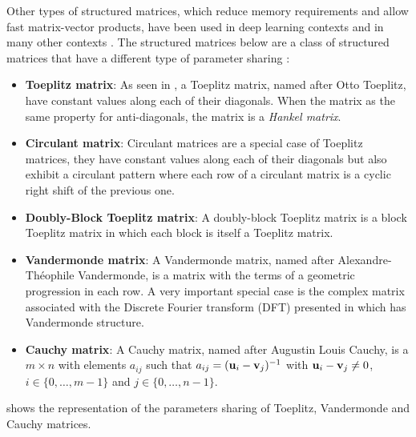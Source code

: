 {%
Other types of structured matrices, which reduce memory requirements and allow fast matrix-vector products, have been used in deep learning contexts and in many other contexts \cite{pan2001structured}.
The structured matrices below are a class of structured matrices that have a different type of parameter sharing :
\begin{itemize}
  \item \textbf{Toeplitz matrix}: As seen in , a Toeplitz matrix, named after Otto Toeplitz, have constant values along each of their diagonals. When the matrix as the same property for anti-diagonals, the matrix is a \emph{Hankel matrix}.
  \item \textbf{Circulant matrix}: Circulant matrices are a special case of Toeplitz matrices, they have constant values along each of their diagonals but also exhibit a circulant pattern where each row of a circulant matrix is a cyclic right shift of the previous one. 
  \item \textbf{Doubly-Block Toeplitz matrix}: A doubly-block Toeplitz matrix is a block Toeplitz matrix in which each block is itself a Toeplitz matrix.
  \item \textbf{Vandermonde matrix}: A Vandermonde matrix, named after Alexandre-Théophile Vandermonde, is a matrix with the terms of a geometric progression in each row.  
    A very important special case is the complex matrix associated with the Discrete Fourier transform (DFT) presented in  which has Vandermonde structure.
  \item \textbf{Cauchy matrix}: A Cauchy matrix, named after Augustin Louis Cauchy, is a $m \times n$ with elements $a_{ij}$ such that $a_{ij} = (\mathbf{u}_i - \mathbf{v}_j)^{-1}$ with $\mathbf{u}_i - \mathbf{v}_j \neq 0$, $i \in \{0,\dots,m-1\}$ and $j \in \{0,\dots,n-1\}$.
\end{itemize}
 shows the representation of the parameters sharing of Toeplitz, Vandermonde and Cauchy matrices.

}
